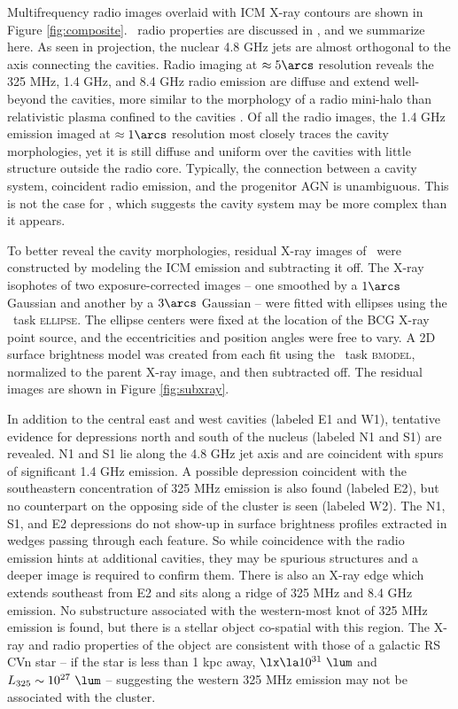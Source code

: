 \documentclass[apjpt4]{aastex}
\begin{document}
Multifrequency radio images overlaid with ICM X-ray contours are shown
in Figure \ref{fig:composite}. \rbs\ radio properties are discussed in
\citet{gitti06}, and we summarize here. As seen in projection, the
nuclear 4.8 GHz jets are almost orthogonal to the axis connecting the
cavities. Radio imaging at $\approx 5\arcs$ resolution reveals the 325
MHz, 1.4 GHz, and 8.4 GHz radio emission are diffuse and extend
well-beyond the cavities, more similar to the morphology of a radio
mini-halo than relativistic plasma confined to the cavities
\citep[][Doria et al., in preparation]{2008A&A...486L..31C}. Of all
the radio images, the 1.4 GHz emission imaged at $\approx 1 \arcs$
resolution most closely traces the cavity morphologies, yet it is
still diffuse and uniform over the cavities with little structure
outside the radio core. Typically, the connection between a cavity
system, coincident radio emission, and the progenitor AGN is
unambiguous. This is not the case for \rbs, which suggests the cavity
system may be more complex than it appears.

To better reveal the cavity morphologies, residual X-ray images of
\rbs\ were constructed by modeling the ICM emission and subtracting it
off. The X-ray isophotes of two exposure-corrected images -- one
smoothed by a $1\arcs$ Gaussian and another by a $3\arcs$ Gaussian --
were fitted with ellipses using the \iraf\ task \textsc{ellipse}. The
ellipse centers were fixed at the location of the BCG X-ray point
source, and the eccentricities and position angles were free to
vary. A 2D surface brightness model was created from each fit using
the \iraf\ task \textsc{bmodel}, normalized to the parent X-ray image,
and then subtracted off. The residual images are shown in Figure
\ref{fig:subxray}.

In addition to the central east and west cavities (labeled E1 and W1),
tentative evidence for depressions north and south of the nucleus
(labeled N1 and S1) are revealed. N1 and S1 lie along the 4.8 GHz jet
axis and are coincident with spurs of significant 1.4 GHz emission. A
possible depression coincident with the southeastern concentration of
325 MHz emission is also found (labeled E2), but no counterpart on the
opposing side of the cluster is seen (labeled W2). The N1, S1, and E2
depressions do not show-up in surface brightness profiles extracted in
wedges passing through each feature. So while coincidence with the
radio emission hints at additional cavities, they may be spurious
structures and a deeper image is required to confirm them. There is
also an X-ray edge which extends southeast from E2 and sits along a
ridge of 325 MHz and 8.4 GHz emission. No substructure associated with
the western-most knot of 325 MHz emission is found, but there is a
stellar object co-spatial with this region. The X-ray and radio
properties of the object are consistent with those of a galactic RS
CVn star \citep{1993RPPh...56.1145S} -- if the star is less than 1 kpc
away, $\lx \la 10^{31} ~\lum$ and $L_{325} \sim 10^{27} ~\lum$ --
suggesting the western 325 MHz emission may not be associated with the
cluster.
\end{document}
